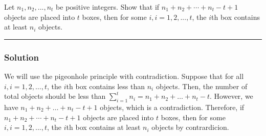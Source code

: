 \newpage
\begin{question}
Let $n_{1} , n_{2} , ... , n_{t}$ be positive integers. Show that if $n_{1} +n_{2} + \cdots  +n_{t} -t+1$ objects are placed into $t$ boxes, then for some $i,i = 1,2,...,t$, the $i$th box contains at least $n_{i}$ objects.
\end{question}

\par\noindent\rule{\textwidth}{0.5pt}

\subsubsection*{Solution}

We will use the pigeonhole principle with contradiction. Suppose that for all $i, i = 1, 2, \dots, t$, the $i$th box contains less than $n_i$ objects. Then, the number of total objects should be less than $\sum_{i=1}^t n_i = n_1 + n_2 + \dots + n_t - t$. However, we have $n_1 + n_2 + \dots + n_t - t + 1$ objects, which is a contradiction. Therefore, if $n_{1} +n_{2} + \cdots  +n_{t} -t+1$ objects are placed into $t$ boxes, then for some $i,i = 1,2,...,t$, the $i$th box contains at least $n_{i}$ objects by contrardicion.